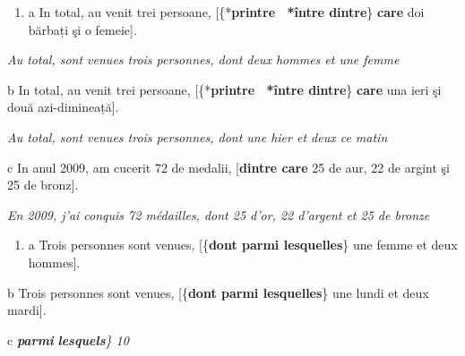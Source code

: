 \begin{enumerate}
\item a  In total, au venit trei persoane, [\{*\textbf{printre {\textbar}~*între {\textbar} dintre}\}\textbf{ care} doi bărbați şi o femeie].


\end{enumerate}
{\itshape
Au total, sont venues trois personnes, dont deux hommes et une femme}

  b  In total, au venit trei persoane, [\{*\textbf{printre {\textbar}~*între {\textbar} dintre}\}\textbf{ care} una ieri şi două azi-dimineață].

{\itshape
Au total, sont venues trois personnes, dont une hier et deux ce matin}

  c  In anul 2009, am cucerit 72 de medalii, [\textbf{dintre care} 25 de aur, 22 de argint şi 25 de bronz].

    \textit{En 2009, j'ai conquis 72 médailles, dont 25 d'or, 22 d'argent et 25 de bronze} 


\begin{enumerate}
\item a  Trois personnes sont venues, [\{\textbf{dont {\textbar} parmi lesquelles}\} une femme et deux hommes].


\end{enumerate}
  b  Trois personnes sont venues, [\{\textbf{dont {\textbar} parmi lesquelles}\} une lundi et deux mardi].

  c  \textstyleapplestylespan{Sur les 78 projets candidats cette année, 12 ont été retenus,}{~[\{}{\textbf{dont {\textbar}} }\emph{\textbf{\textup{parmi}}}\emph{\textup{} }\emph{\textbf{\textup{lesquels}}}\emph{\textup{\} 10}}{~}\emph{\textup{} }

